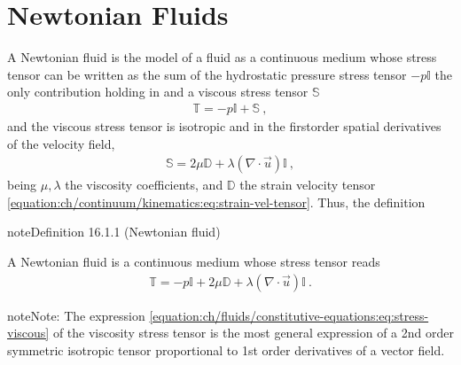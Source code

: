 \documentclass[letterpaper,10pt,english]{jupyterBook}
\begin{document}
\section{Newtonian Fluids}
\label{\detokenize{ch/fluids/constitutive-equations:newtonian-fluids}}\label{\detokenize{ch/fluids/constitutive-equations:fluid-mechanics-constutive-equations-newtonian}}
\sphinxAtStartPar
A Newtonian fluid is the model of a fluid as a continuous medium whose stress tensor can be written as the sum of the hydrostatic pressure stress tensor \(-p \mathbb{I}\) \sphinxhyphen{} the only contribution holding in {\hyperref[\detokenize{ch/fluids/statics:fluid-mechanics-statics}]{}} \sphinxhyphen{} and a viscous stress tensor \(\mathbb{S}\)
\begin{equation*}
\begin{split}\mathbb{T} = -p \mathbb{I} + \mathbb{S} \ ,\end{split}
\end{equation*}
\sphinxAtStartPar
and the viscous stress tensor is isotropic and  in the first\sphinxhyphen{}order spatial derivatives of the velocity field,
\begin{equation}\label{equation:ch/fluids/constitutive-equations:eq:stress-viscous}
\begin{split}\mathbb{S} = 2 \mu \mathbb{D} + \lambda (\nabla \cdot \vec{u}) \mathbb{I} \ ,\end{split}
\end{equation}
\sphinxAtStartPar
being \(\mu, \lambda\) the viscosity coefficients, and \(\mathbb{D}\) the strain velocity tensor \eqref{equation:ch/continuum/kinematics:eq:strain-vel-tensor}. Thus, the definition
\label{ch/fluids/constitutive-equations:definition-0}
\begin{sphinxadmonition}{note}{Definition 16.1.1 (Newtonian fluid)}



\sphinxAtStartPar
A Newtonian fluid is a continuous medium whose stress tensor reads
\begin{equation}\label{equation:ch/fluids/constitutive-equations:eq:stress-newtonian}
\begin{split}\mathbb{T} = - p \mathbb{I} + 2 \mu \mathbb{D} + \lambda (\nabla \cdot \vec{u}) \mathbb{I} \ .\end{split}
\end{equation}\end{sphinxadmonition}

\begin{sphinxadmonition}{note}{Note:}
\sphinxAtStartPar
The expression \eqref{equation:ch/fluids/constitutive-equations:eq:stress-viscous} of the viscosity stress tensor is the most general expression of a 2\sphinxhyphen{}nd order symmetric isotropic tensor proportional to 1\sphinxhyphen{}st order derivatives of a vector field.
\end{sphinxadmonition}
\end{document}
